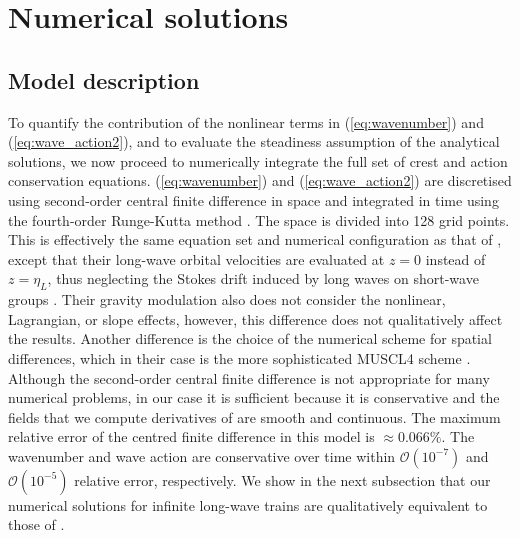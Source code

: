 \documentclass[lineno]{jfm}
\begin{document}
\section{Numerical solutions}
\label{section:numerical_solutions}

\subsection{Model description}

To quantify the contribution of the nonlinear terms in (\ref{eq:wavenumber})
and (\ref{eq:wave_action2}), and to evaluate the steadiness assumption of the
analytical solutions, we now proceed to numerically integrate the full set of
crest and action conservation equations.
(\ref{eq:wavenumber}) and (\ref{eq:wave_action2}) are discretised using
second-order central finite difference in space and integrated in time using the
fourth-order Runge-Kutta method \citep{butcher1996runge}.
The space is divided into 128 grid points.
This is effectively the same equation set and numerical configuration as that of
\citet{peureux2021unsteady}, except that their long-wave orbital velocities are
evaluated at $z=0$ instead of $z=\eta_L$, thus neglecting the Stokes drift
induced by long waves on short-wave groups
\citep{stokes1847,van2018stokes,monismith2020stokes}.
Their gravity modulation also does not consider the nonlinear, Lagrangian, or
slope effects, however, this difference does not qualitatively affect the results.
Another difference is the choice of the numerical scheme for spatial differences,
which in their case is the more sophisticated MUSCL4 scheme \citep{kurganov2000new}.
Although the second-order central finite difference is not appropriate for many
numerical problems, in our case it is sufficient because it is conservative and
the fields that we compute derivatives of are smooth and continuous.
The maximum relative error of the centred finite difference in this model
is $\approx 0.066\%$.
The wavenumber and wave action are conservative over time within
$\mathcal{O}(10^{-7})$ and $\mathcal{O}(10^{-5})$ relative error, respectively.
We show in the next subsection that our numerical solutions for infinite long-wave
trains are qualitatively equivalent to those of \citet{peureux2021unsteady}.
\end{document}
